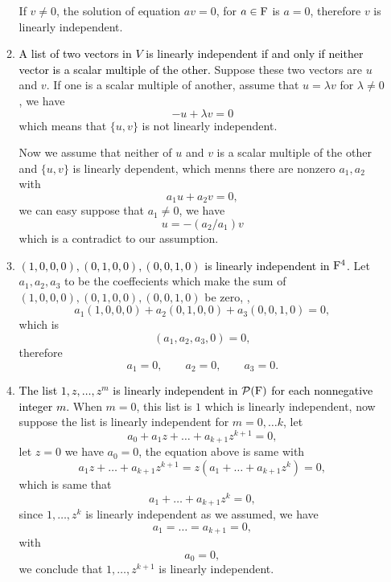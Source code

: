 \begin{enumerate}
\begin{solution}
\begin{enumerate}[label=(\alph*)]
                    If $v \neq 0$, the solution of equation $av = 0$, for $a \in \mathrm{F}$ is $a = 0$, therefore $v$ is linearly independent.
                \item \textcolor{black}{A list of two vectors in $V$ is linearly independent if and only if neither vector is a scalar multiple of the other.}
                    Suppose these two vectors are $u$ and $v$. If one is a scalar multiple of another, assume that $u = \lambda v$ for $\lambda \neq 0$,
                    we have 
                    \[ -u + \lambda v = 0\]
                    which means that $\{u,v\}$ is not linearly independent.

                    Now we assume that neither of $u$ and $v$ is a scalar multiple of the other and $\{u,v\}$ is linearly dependent, which menns there are nonzero 
                    $a_1, a_2$ with 
                    \[ a_1 u + a_2v = 0,\]
                    we can easy suppose that $a_1 \neq 0$, we have 
                    \[ u = -(a_2/a_1)v\]
                    which is a contradict to our assumption.
                \item \textcolor{black}{$(1,0,0,0),(0,1,0,0),(0,0,1,0)$ is linearly independent in $\mathrm{F}^4$.}
                    Let $a_1, a_2, a_3$ to be the coeffecients which make the sum of $(1,0,0,0),(0,1,0,0),(0,0,1,0)$ be zero, \ie, 
                    \[ a_1(1,0,0,0) + a_2(0,1,0,0)+a_3(0,0,1,0) =0,\]
                    which is 
                    \[ (a_1,a_2,a_3,0) = 0, \]
                    therefore 
                    \[ a_1 =0, \qquad a_2=0, \qquad a_3=0.\]
                \item \textcolor{black}{The list $1, z, \ldots, z^m$ is linearly independent in $\mathcal{P}(\mathrm{F})$ for each nonnegative integer $m$.}
                    When $m=0$, this list is $1$ which is linearly independent, now suppose the list is linearly independent for $m=0,\ldots k$,
                    let 
                    \[ a_0 + a_1z + \dots + a_{k+1}z^{k+1} = 0,\]
                    let $z = 0$ we have $a_0=0$, the equation above is same with 
                    \[ a_1 z + \dots + a_{k+1}z^{k+1} = z(a_1 + \dots + a_{k+1}z^k) = 0,\]
                    which is same that 
                    \[ a_1 + \dots + a_{k+1}z^k = 0,\]
                    since $1, \ldots, z^{k}$ is linearly independent as we assumed, we have 
                    \[ a_1 = \dots = a_{k+1} = 0, \]
                    with 
                    \[ a_0 = 0, \]
                    we conclude that $1 ,\dots, z^{k+1}$ is linearly independent.
            \end{enumerate}

\end{solution}
\end{enumerate}
